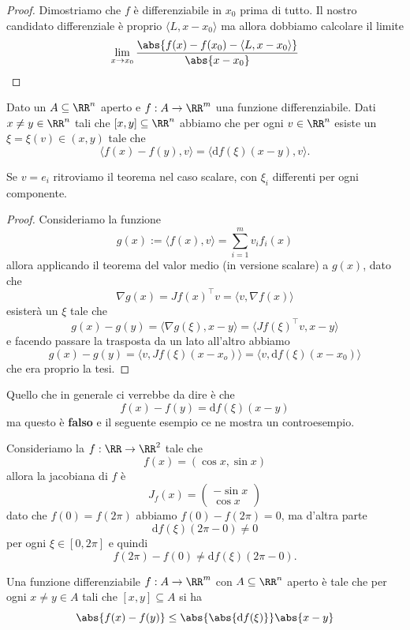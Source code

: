 \documentclass[11pt]{scrartcl}
\newcommand{\dif}{\text{d}}
\begin{document}
	\begin{proof}
		Dimostriamo che $f$ è differenziabile in $x_0$ prima di tutto. Il nostro candidato differenziale è proprio $\langle L,x-x_0\rangle$ ma allora dobbiamo calcolare il limite
		$$\lim_{x\to x_0}\frac{\abs{f(x)-f(x_0)-\langle L, x-x_0\rangle}}{\abs{x-x_0}}$$
	\end{proof}
	\begin{theorem}
		Dato un $A\subseteq \RR^n$ aperto e $f:A\to\RR^m$ una funzione differenziabile. Dati $x\ne y\in\RR^n$ tali che $[x,y]\subseteq \RR^n$ abbiamo che per ogni $v\in\RR^n$ esiste un $\xi = \xi(v)\in (x,y)$ tale che 
		$$\langle f(x)-f(y),v\rangle=\langle \dif f(\xi)(x-y),v	\rangle.$$
	\end{theorem}
	\begin{remark}
		Se $v=e_i$ ritroviamo il teorema nel caso scalare, con $\xi_i$ differenti per ogni componente.
	\end{remark}
	\begin{proof}
		Consideriamo la funzione
		$$g(x):=\langle f(x),v\rangle =\sum_{i=1}^m v_if_i(x)$$
		allora applicando il teorema del valor medio (in versione scalare) a $g(x)$, dato che
		$$\nabla g(x)=Jf(x)^\intercal v=\langle v,\nabla f (x)\rangle$$
		esisterà un $\xi$ tale che
		$$g(x)-g(y)=\langle \nabla g(\xi),x-y\rangle=\langle Jf(\xi)^\intercal v,x-y\rangle$$
		e facendo passare la trasposta da un lato all'altro abbiamo
		$$g(x)-g(y)=\langle v,Jf(\xi)(x-x_o)\rangle = \langle v, \dif f(\xi)(x-x_0)\rangle$$
		che era proprio la tesi.
	\end{proof}
	Quello che in generale ci verrebbe da dire è che
	$$f(x)-f(y)=\dif f(\xi)(x-y)$$
	ma questo è \textbf{falso} e il seguente esempio ce ne mostra un controesempio.
	\begin{example}
		Consideriamo la $f:\RR\to\RR^2$ tale che
		$$f(x)=\left(\cos x , \sin x\right)$$
		allora la jacobiana di $f$ è
		$$J_f(x)=
		\begin{pmatrix}
			-\sin x \\
			\cos x
		\end{pmatrix}
		$$
		dato che $f(0)=f(2\pi)$ abbiamo $f(0)-f(2\pi)=0$, ma d'altra parte
		$$\dif f (\xi)(2\pi-0)\ne 0$$
		per ogni $\xi\in [0,2\pi]$ e quindi
		$$f(2\pi)-f(0)\ne \dif f (\xi)(2\pi-0).$$
	\end{example}
	\begin{lemma}
		Una funzione differenziabile $f:A\to\RR^m$ con $A\subseteq \RR^n$ aperto è tale che per ogni $x\ne y\in A$ tali che $[x,y]\subseteq A$ si ha 
		$$\abs{f(x)-f(y)}\le \abs{\abs{\dif f(\xi)}}\abs{x-y}$$
	\end{lemma}
\end{document}

